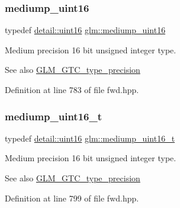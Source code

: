 \subsubsection{\texorpdfstring{mediump\+\_\+uint16}{mediump\_uint16}}
{\footnotesize\ttfamily typedef \hyperlink{namespaceglm_1_1detail_a47b2a7d006d187338e8031a352d1ce56}{detail\+::uint16} \hyperlink{group__gtc__type__precision_ga2cef3a0d7b0fce75c9885f64656d8933}{glm\+::mediump\+\_\+uint16}}

Medium precision 16 bit unsigned integer type. \begin{DoxySeeAlso}{See also}
\hyperlink{group__gtc__type__precision}{G\+L\+M\+\_\+\+G\+T\+C\+\_\+type\+\_\+precision} 
\end{DoxySeeAlso}


Definition at line 783 of file fwd.\+hpp.

\mbox{\label{group__gtc__type__precision_ga0b385466deac5ac96061ef2cdd6db20f}} 
\subsubsection{\texorpdfstring{mediump\+\_\+uint16\+\_\+t}{mediump\_uint16\_t}}
{\footnotesize\ttfamily typedef \hyperlink{namespaceglm_1_1detail_a47b2a7d006d187338e8031a352d1ce56}{detail\+::uint16} \hyperlink{group__gtc__type__precision_ga0b385466deac5ac96061ef2cdd6db20f}{glm\+::mediump\+\_\+uint16\+\_\+t}}

Medium precision 16 bit unsigned integer type. \begin{DoxySeeAlso}{See also}
\hyperlink{group__gtc__type__precision}{G\+L\+M\+\_\+\+G\+T\+C\+\_\+type\+\_\+precision} 
\end{DoxySeeAlso}


Definition at line 799 of file fwd.\+hpp.

\mbox{\label{group__gtc__type__precision_ga861dbd1051f488e425b3966001b568e5}} 
